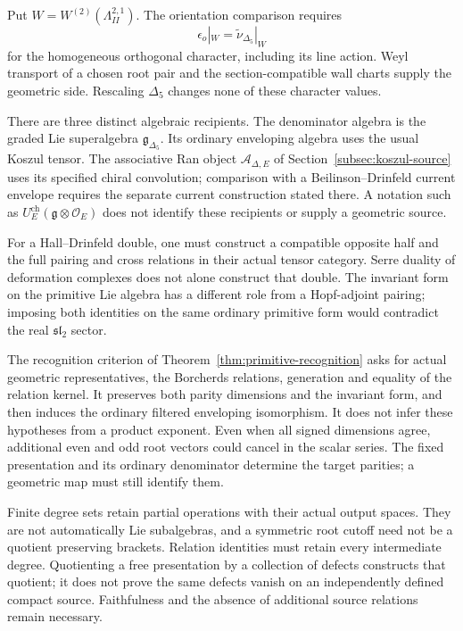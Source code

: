 Put \(W=W^{(2)}(\Lambda_{II}^{2,1})\). The orientation comparison
requires
\[
 \epsilon_o|_W=\widetilde\nu_{\Delta_5}|_W
\]
for the homogeneous orthogonal character, including its line action.
Weyl transport of a chosen root pair and the section-compatible wall
charts supply the geometric side. Rescaling \(\Delta_5\) changes
none of these character values.

There are three distinct algebraic recipients. The denominator
algebra is the graded Lie superalgebra \(\mathfrak g_{\Delta_5}\).
Its ordinary enveloping algebra uses the usual Koszul tensor. The
associative Ran object \(\mathcal A_{\Delta,E}\) of
Section~\ref{subsec:koszul-source} uses its specified chiral
convolution; comparison with a Beilinson--Drinfeld current envelope
requires the separate current construction stated there. A notation
such as \(U_E^{\mathrm{ch}}(\mathfrak g\otimes\mathcal O_E)\)
does not identify these recipients or supply a geometric source.

For a Hall--Drinfeld double, one must construct a compatible
opposite half and the full pairing and cross relations in their
actual tensor category. Serre duality of deformation complexes does
not alone construct that double. The invariant form on the primitive
Lie algebra has a different role from a Hopf-adjoint pairing; imposing
both identities on the same ordinary primitive form would contradict
the real \(\mathfrak{sl}_2\) sector.

The recognition criterion of
Theorem~\ref{thm:primitive-recognition} asks for actual geometric
representatives, the Borcherds relations, generation and equality of
the relation kernel. It preserves both parity dimensions and the
invariant form, and then induces the ordinary filtered enveloping
isomorphism. It does not infer these hypotheses from a product
exponent. Even when all signed dimensions agree, additional even and
odd root vectors could cancel in the scalar series. The fixed
presentation and its ordinary denominator determine the target
parities; a geometric map must still identify them.

Finite degree sets retain partial operations with their actual output
spaces. They are not automatically Lie subalgebras, and a symmetric
root cutoff need not be a quotient preserving brackets. Relation
identities must retain every intermediate degree. Quotienting a
free presentation by a collection of defects constructs that
quotient; it does not prove the same defects vanish on an
independently defined compact source. Faithfulness and the
absence of additional source relations remain necessary.

